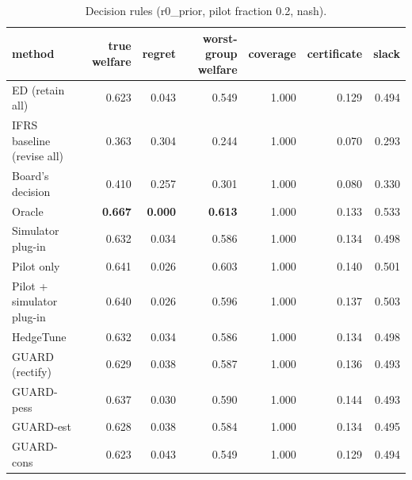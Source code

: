 \begin{table}[t]
\centering
\small
\begin{tabular}{lrrrrrr}
\toprule
method & true welfare & regret & worst-group welfare & coverage & certificate & slack \\
\midrule
ED (retain all) & 0.623 & 0.043 & 0.549 & 1.000 & 0.129 & 0.494 \\
IFRS baseline (revise all) & 0.363 & 0.304 & 0.244 & 1.000 & 0.070 & 0.293 \\
Board's decision & 0.410 & 0.257 & 0.301 & 1.000 & 0.080 & 0.330 \\
Oracle & \textbf{0.667} & \textbf{0.000} & \textbf{0.613} & 1.000 & 0.133 & 0.533 \\
Simulator plug-in & 0.632 & 0.034 & 0.586 & 1.000 & 0.134 & 0.498 \\
Pilot only & 0.641 & 0.026 & 0.603 & 1.000 & 0.140 & 0.501 \\
Pilot + simulator plug-in & 0.640 & 0.026 & 0.596 & 1.000 & 0.137 & 0.503 \\
HedgeTune & 0.632 & 0.034 & 0.586 & 1.000 & 0.134 & 0.498 \\
GUARD (rectify) & 0.629 & 0.038 & 0.587 & 1.000 & 0.136 & 0.493 \\
GUARD-pess & 0.637 & 0.030 & 0.590 & 1.000 & 0.144 & 0.493 \\
GUARD-est & 0.628 & 0.038 & 0.584 & 1.000 & 0.134 & 0.495 \\
GUARD-cons & 0.623 & 0.043 & 0.549 & 1.000 & 0.129 & 0.494 \\
\bottomrule
\end{tabular}
\caption{Decision rules (r0\_prior, pilot fraction 0.2, nash).}
\label{tab:methods-nash}
\end{table}
